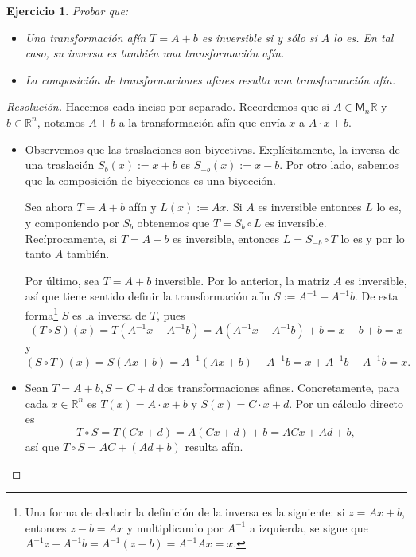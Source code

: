 \documentclass[11pt]{article}
\theoremstyle{colored}
\newtheorem{exercise}{Ejercicio}
\newcommand{\R}{\mathbb{R}}
\newcommand{\M}[2]{\mathsf{M}_{#1}#2}
\begin{document}
\begin{exercise} Probar que:
\begin{itemize}
\item[(i)] Una transformación afín $T = A + b$ es inversible si y sólo si $A$ lo es. En tal caso, su inversa es también una transformación afín.
\item[(ii)] La composición de transformaciones afines resulta una transformación afín. 
\end{itemize}
\end{exercise}
\begin{proof}[Resolución] Hacemos cada inciso por separado. Recordemos que si $A \in \M{n}{\R}$ y $b \in \R^n$, notamos $A + b$ a la transformación afín que envía $x$ a $A \cdot x + b$.
\begin{itemize}[listparindent = \parindent]
\item[(i)] Observemos que las traslaciones son biyectivas. Explícitamente, la inversa de una traslación $S_b(x) := x+b$ es $S_{-b}(x) := x-b$. Por otro lado, sabemos que la composición de biyecciones es una biyección. 

Sea ahora $T = A + b$ afín y $L(x) := Ax$. Si $A$ es inversible entonces $L$ lo es, y componiendo por $S_b$ obtenemos que $T = S_b \circ L$ es inversible. Recíprocamente, si $T = A+b$ es inversible, entonces $L = S_{-b} \circ T$ lo es y por lo tanto $A$ también.

Por último, sea $T = A + b$ inversible. Por lo anterior, la matriz $A$ es inversible, así que tiene sentido definir la transformación afín $S := A^{-1} - A^{-1}b$. De esta forma\footnote{Una forma de deducir la definición de la inversa es la siguiente: si $z = Ax + b$, entonces $z-b = Ax$ y multiplicando por $A^{-1}$ a izquierda, se sigue que $A^{-1}z-A^{-1}b = A^{-1}(z-b) = A^{-1}Ax = x$.} $S$ es la inversa de $T$, pues
\[
(T \circ S)(x) = T(A^{-1}x - A^{-1}b) = A(A^{-1}x - A^{-1}b) + b = x -b+b = x
\]
y
\[
(S \circ T)(x) = S(Ax+b) = A^{-1}(Ax+b) - A^{-1}b = x + A^{-1}b-A^{-1}b = x.
\]
\item[(ii)] Sean $T = A +b, S = C +d$ dos transformaciones afines. Concretamente, para cada $x \in \R^n$ es $T(x) = A\cdot x + b$ y $S(x) = C \cdot x + d$. Por un cálculo directo es
\[
T \circ S = T(Cx+d) = A(Cx+d) +b = ACx + Ad+b,
\]
así que $T \circ S = AC + (Ad+b)$ resulta afín.
\end{itemize}
\end{proof}
\end{document}
